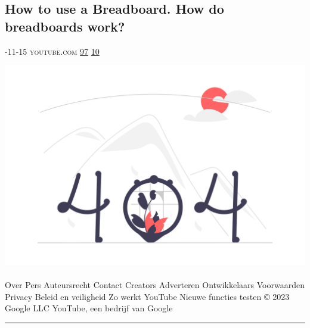 \documentclass[10pt,a4paper]{article}
\begin{document}
\begin{multicols*}{2}
\begin{minipage}{\linewidth}
\subsection{How to use a Breadboard. How do breadboards work?}
\textsc{\footnotesize
{\scriptsize\faCalendar}-11-15 
{\scriptsize\faYoutube}\space 
youtube.com 
{\scriptsize\faThumbsOUp}\space 
\href{http://news.ycombinator.com/item?id=37210146\&utm\_term=comment}{97} 
{\scriptsize\faComments}\space 
\href{http://news.ycombinator.com/item?id=37210146\&utm\_term=comment}{10} 
}
\par\medskip\noindent
\href{https://www.youtube.com/watch?v=BYOiYvdaCis\&utm\_source=hackernewsletter\&utm\_medium=email\&utm\_term=watching}{
    \includegraphics[width=0.99\linewidth]{notfound.png}
}
\end{minipage}
\paragraph{}
Over
Pers
Auteursrecht
Contact
Creators
Adverteren
Ontwikkelaars
Voorwaarden
Privacy
Beleid en veiligheid
Zo werkt YouTube
Nieuwe functies testen
© 2023 Google LLC
YouTube, een bedrijf van Google
\par\noindent\textcolor{red}{\rule{\linewidth}{0.2mm}}
\vfill
\null
\noindent\begin{minipage}{\linewidth}

\end{minipage}
\end{multicols*}
\end{document}
